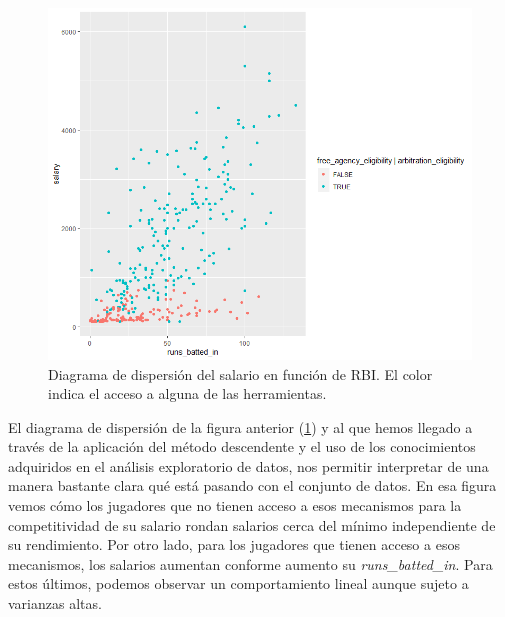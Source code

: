 \documentclass[a4paper,12pt, oneside]{book}
\begin{document}
\begin{figure}[H]
\centering
\includegraphics[scale=0.7]{images/competitivity_plot.png}
\caption{Diagrama de dispersión del salario en función de RBI. El color indica el acceso a alguna de las herramientas.}
\label{interpretregplot}
\end{figure}

El diagrama de dispersión de la figura anterior (\ref{interpretregplot}) y al que hemos llegado a través de la aplicación del método descendente y el uso de los conocimientos adquiridos en el análisis exploratorio de datos, nos permitir interpretar de una manera bastante clara qué está pasando con el conjunto de datos. En esa figura vemos cómo los jugadores que no tienen acceso a esos mecanismos para la competitividad de su salario rondan salarios cerca del mínimo independiente de su rendimiento. Por otro lado, para los jugadores que tienen acceso a esos mecanismos, los salarios aumentan conforme aumento su \textit{runs\_batted\_in}. Para estos últimos, podemos observar un comportamiento lineal aunque sujeto a varianzas altas. \\
\end{document}
